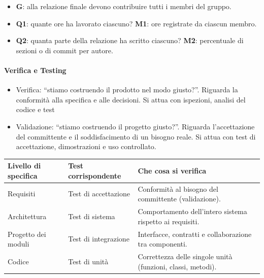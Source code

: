 \documentclass[12pt]{extarticle}
\begin{document}
\begin{itemize}
    \item \textbf{G}: alla relazione finale devono contribuire tutti i membri del gruppo.
    \item \textbf{Q1}: quante ore ha lavorato ciascuno? \quad \textbf{M1}: ore registrate da ciascun membro.
    \item \textbf{Q2}: quanta parte della relazione ha scritto ciascuno? \quad \textbf{M2}: percentuale di sezioni o di commit per autore.
\end{itemize}

\paragraph{Verifica e Testing}
\begin{itemize}
    \item Verifica: ``stiamo costruendo il prodotto nel modo giusto?''. Riguarda la conformità alla specifica e alle decisioni. Si attua con ispezioni, analisi del codice e test
    \item Validazione: ``stiamo costruendo il progetto giusto?''. Riguarda l'accettazione del committente e il soddisfacimento di un bisogno reale. Si attua con test di accettazione, dimostrazioni e uso controllato.
\end{itemize}

\begin{center}
\small
\begin{tabular}{p{4.2cm}p{5.2cm}p{6.4cm}}
    \toprule
    \textbf{Livello di specifica} & \textbf{Test corrispondente} & \textbf{Che cosa si verifica} \\
    \midrule
    Requisiti & Test di accettazione & Conformità al bisogno del committente (validazione). \\
    \addlinespace
    Architettura & Test di sistema & Comportamento dell'intero sistema rispetto ai requisiti. \\
    \addlinespace
    Progetto dei moduli & Test di integrazione & Interfacce, contratti e collaborazione tra componenti. \\
    \addlinespace
    Codice & Test di unità & Correttezza delle singole unità (funzioni, classi, metodi). \\
    \bottomrule
\end{tabular}
\end{center}
\end{document}
